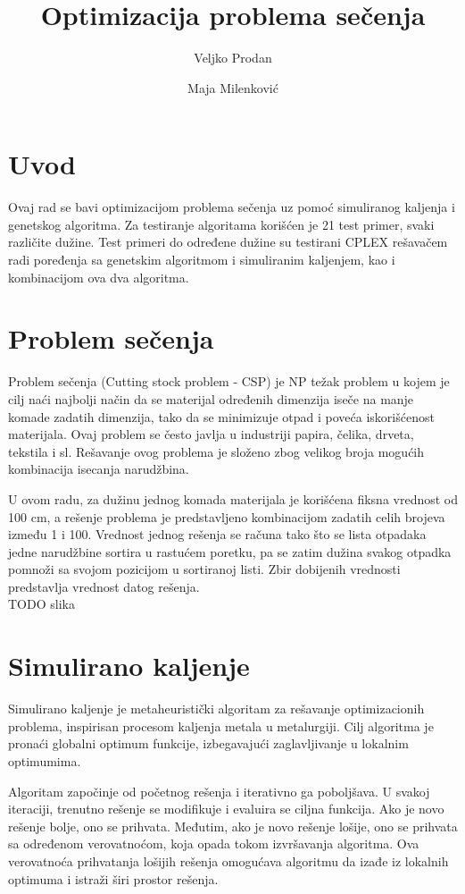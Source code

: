 \documentclass[12pt, a4paper]{article}
\title{Optimizacija problema sečenja}
\author{\small Veljko Prodan \and \small Maja Milenković}
\date{}
\begin{document}
\maketitle


\section{Uvod}
Ovaj rad se bavi optimizacijom problema sečenja uz pomoć simuliranog kaljenja i genetskog algoritma. Za testiranje algoritama korišćen je 21 test primer, svaki različite dužine. Test primeri do određene dužine su testirani CPLEX rešavačem radi poređenja sa genetskim algoritmom i simuliranim kaljenjem, kao i kombinacijom ova dva algoritma.

\section{Problem sečenja}
Problem sečenja (Cutting stock problem - CSP) je NP težak problem u kojem je cilj naći najbolji način da se materijal određenih dimenzija iseče na manje komade zadatih dimenzija, tako da se minimizuje otpad i poveća iskorišćenost materijala. Ovaj problem se često javlja u industriji papira, čelika, drveta, tekstila i sl. Rešavanje ovog problema je složeno zbog velikog broja mogućih kombinacija isecanja narudžbina.

U ovom radu, za dužinu jednog komada materijala je korišćena fiksna vrednost od 100 cm, a rešenje problema je predstavljeno kombinacijom zadatih celih brojeva između 1 i 100. Vrednost jednog rešenja se računa tako što se lista otpadaka jedne narudžbine sortira u rastućem poretku, pa se zatim dužina svakog otpadka pomnoži sa svojom pozicijom u sortiranoj listi. Zbir dobijenih vrednosti predstavlja vrednost datog rešenja. \\

TODO slika

\section{Simulirano kaljenje}
Simulirano kaljenje je metaheuristički algoritam za rešavanje optimizacionih problema, inspirisan procesom kaljenja metala u metalurgiji. Cilj algoritma je pronaći globalni optimum funkcije, izbegavajući zaglavljivanje u lokalnim optimumima.

Algoritam započinje od početnog rešenja i iterativno ga poboljšava. U svakoj iteraciji, trenutno rešenje se modifikuje i evaluira se ciljna funkcija. Ako je novo rešenje bolje, ono se prihvata. Međutim, ako je novo rešenje lošije, ono se prihvata sa određenom verovatnoćom, koja opada tokom izvršavanja algoritma. Ova verovatnoća prihvatanja lošijih rešenja omogućava algoritmu da izađe iz lokalnih optimuma i istraži širi prostor rešenja. \\
\end{document}
